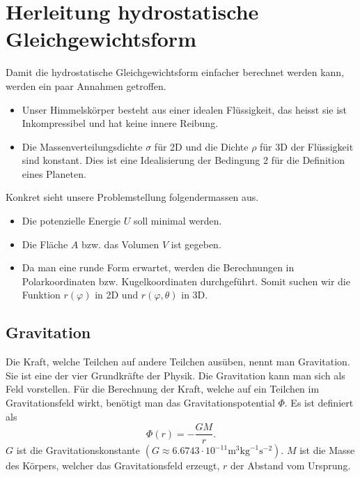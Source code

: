 %
%
%
%
\section{Herleitung hydrostatische Gleichgewichtsform
\label{planet:section:teil1}}
Damit die hydrostatische Gleichgewichtsform einfacher berechnet werden kann, werden ein paar Annahmen getroffen.
\begin{itemize}
	\item Unser Himmelskörper besteht aus einer idealen Flüssigkeit, das heisst sie ist Inkompressibel und hat keine innere Reibung.
	\item Die Massenverteilungsdichte \(\sigma\) für 2D und die Dichte \(\rho\) für 3D der Flüssigkeit sind konstant.
	Dies ist eine Idealisierung der Bedingung 2 für die Definition eines Planeten.
\end{itemize}

\noindent
Konkret sieht unsere Problemstellung folgendermassen aus.
\begin{itemize}
	\item Die potenzielle Energie \(U\) soll minimal werden.
	\item Die Fläche \(A\) bzw. das Volumen \(V\) ist gegeben.
	\item Da man eine runde Form erwartet, werden die Berechnungen in Polarkoordinaten bzw. Kugelkoordinaten durchgeführt. Somit suchen wir die Funktion \(r(\varphi)\) in 2D und \(r(\varphi,\theta)\) in 3D.
\end{itemize}

\subsection{Gravitation}

Die Kraft, welche Teilchen auf andere Teilchen ausüben, nennt man Gravitation.
Sie ist eine der vier Grundkräfte der Physik.
Die Gravitation kann man sich als Feld vorstellen.
Für die Berechnung der Kraft, welche auf ein Teilchen im Gravitationsfeld wirkt, benötigt man das Gravitationspotential \(\Phi\).
Es ist definiert als
\begin{equation}
	\Phi(r) = -\frac{GM}{r}.
	\label{planet:equ:gravpot}
\end{equation}
\(G\) ist die Gravitationskonstante \((G \approx 6.6743 \cdot 10^{-11} \text{m}^3 \text{kg}^{-1} \text{s}^{-2})\).
\(M\) ist die Masse des Körpers, welcher das Gravitationsfeld erzeugt, \(r\) der Abstand vom Ursprung.

